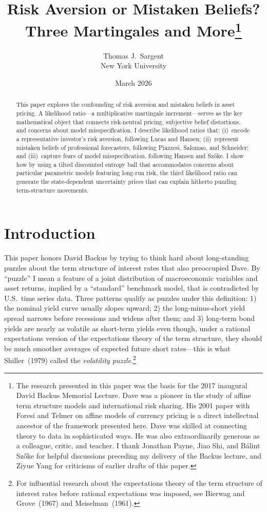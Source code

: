 \documentclass[12pt]{article}
\title{Risk Aversion or Mistaken Beliefs?\\[6pt]
\large Three Martingales and More\thanks{The research presented in this paper was  the basis for
the 2017 inaugural David Backus Memorial Lecture.
Dave was a pioneer in the study of affine term structure models and
international risk sharing.
His 2001 paper with Foresi and Telmer on affine models of currency
pricing is a direct intellectual ancestor of the framework presented
here.
Dave was skilled at connecting theory to data in sophisticated ways. He was also extraordinarily generous as a colleague,
critic, and teacher.
I thank Jonathan Payne, Jiao Shi, and B\'alint Sz\H{o}ke for helpful discussions preceding my delivery of the Backus lecture,
and Ziyue Yang for criticisms of earlier drafts of this paper.}}
\author{Thomas J.\ Sargent\\[4pt]
\small New York University}
\date{March 2026}
\theoremstyle{definition}
\begin{document}
\maketitle

\begin{abstract}
This paper explores the confounding of risk aversion and mistaken beliefs
in asset pricing.  A likelihood ratio---a multiplicative martingale
increment---serves as the key mathematical object that connects
risk-neutral pricing, subjective belief distortions, and concerns about
model misspecification.  I describe  likelihood ratios that:
(i)~encode a representative investor's risk aversion, following
Lucas and Hansen; (ii)~represent mistaken beliefs of professional
forecasters, following Piazzesi, Salomao, and Schneider; and (iii)~capture fears of model misspecification, following Hansen and
Sz\H{o}ke.  I show how by using  a tilted discounted entropy
ball that accommodates concerns about particular parametric models
featuring long-run risk, the third likelihood ratio can generate the state-dependent uncertainty
prices that can explain hitherto puzzling term-structure movements.
\end{abstract}

\newpage

\section{Introduction}
\label{sec:intro}



This paper honors  David Backus by trying to think hard about   long-standing puzzles about the term structure of interest rates that also  preoccupied Dave. By ``puzzle'' I mean a feature of a joint distribution of macroeconomic variables and asset returns, implied by a ``standard'' benchmark model, that is contradicted by U.S.\ time series data. Three patterns qualify as puzzles under this definition: 1) the nominal yield curve usually slopes upward; 2) the long-minus-short yield spread narrows before recessions and widens after them; and 3) long-term bond yields are nearly as volatile as short-term yields even though, under a rational expectations version of the expectations theory of the term structure, they should be much smoother averages of expected future short rates---this is what Shiller~(1979) called the \emph{volatility puzzle}.\footnote{For influential research about the expectations theory of the term structure of interest rates before rational expectations was imposed, see Bierwag and Grove~(1967) and Meiselman~(1961).}
\end{document}
